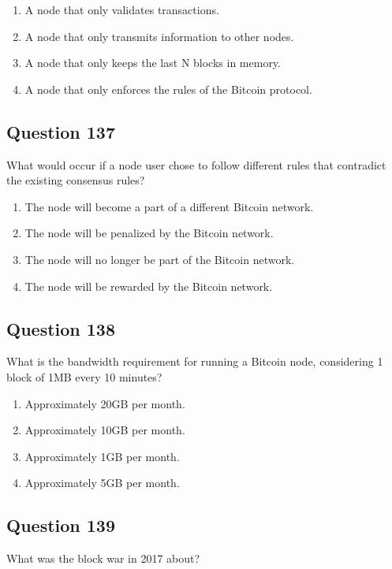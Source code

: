 \documentclass[12pt,a4paper]{article}
\begin{document}
\begin{enumerate}[label=\Alph*., leftmargin=*]
\item A node that only validates transactions.
\item A node that only transmits information to other nodes.
\item A node that only keeps the last N blocks in memory.
\item A node that only enforces the rules of the Bitcoin protocol.
\end{enumerate}

\bigskip


\subsection*{Question 137}
What would occur if a node user chose to follow different rules that contradict the existing consensus rules?

\begin{enumerate}[label=\Alph*., leftmargin=*]
\item The node will become a part of a different Bitcoin network.
\item The node will be penalized by the Bitcoin network.
\item The node will no longer be part of the Bitcoin network.
\item The node will be rewarded by the Bitcoin network.
\end{enumerate}

\bigskip


\subsection*{Question 138}
What is the bandwidth requirement for running a Bitcoin node, considering 1 block of 1MB every 10 minutes?

\begin{enumerate}[label=\Alph*., leftmargin=*]
\item Approximately 20GB per month.
\item Approximately 10GB per month.
\item Approximately 1GB per month.
\item Approximately 5GB per month.
\end{enumerate}

\bigskip


\subsection*{Question 139}
What was the block war in 2017 about?
\end{document}
